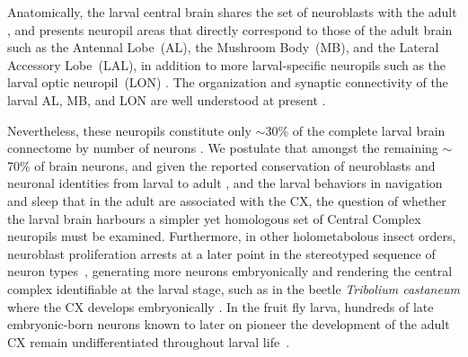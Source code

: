     Anatomically, the larval central brain shares the set of neuroblasts with the adult \citep{lacin2016lineage}, and presents neuropil areas that directly correspond to those of the adult brain such as the Antennal Lobe~(AL), the Mushroom Body~(MB), and the Lateral Accessory Lobe~(LAL), in addition to more larval-specific neuropils such as the larval optic neuropil~(LON) \citep{pereanu2010neuropildev}.
    The organization and synaptic connectivity of the larval AL, MB, and LON are well understood at present \citep{berck2016wiring, eichler2017complete, larderet2017opticlobe}.
    
    Nevertheless, these neuropils constitute only $\sim$30\% of the complete larval brain connectome by number of neurons \citep{winding2023connectome}.
    We postulate that amongst the remaining $\sim$70\% of brain neurons, and given the reported conservation of neuroblasts \citep{lacin2016lineage} and neuronal identities from larval to adult \citep{truman2023metamorphosis}, and the larval behaviors in navigation and sleep that in the adult are associated with the CX, the question of whether the larval brain harbours a simpler yet homologous set of Central Complex neuropils must be examined.
    Furthermore, in other holometabolous insect orders, neuroblast proliferation arrests at a later point in the stereotyped sequence of neuron types~\citep{truman1999origins}, generating more neurons embryonically and rendering the central complex identifiable at the larval stage, such as in the beetle \textit{Tribolium castaneum} where the CX develops embryonically \citep{koniszewski2016TriboliumCX, farnworth2020TriboliumCXvsFly}.
    In the fruit fly larva, hundreds of late embryonic-born neurons known to later on pioneer the development of the adult CX remain undifferentiated throughout larval life~\citep{andrade2019developmentally}.

